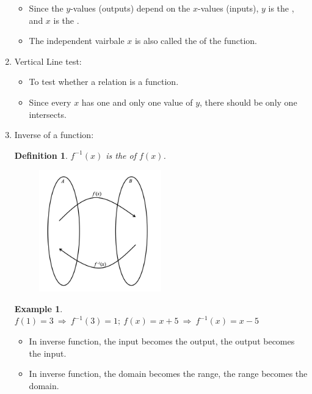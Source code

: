 \documentclass[12pt, a4paper]{article}
\newtheorem{definition}{Definition}[subsection]
\newtheorem{example}{Example}[subsection]
\begin{document}
\begin{enumerate}
\begin{itemize}
\begin{enumerate}
        \end{enumerate}
        \item Since the $y$-values (outputs) depend on the $x$-values (inputs), $y$ is the \textbf{\color{red}{dependent variable}}, and $x$ is the \textbf{\color{red}{independent variable}}.
        \item The independent vairbale $x$ is also called the \textbf{\color{red}{argument}} of the function. 
    \end{itemize}
    \item Vertical Line test: 
    \begin{itemize}
        \item To test whether a relation is a function. 
        \item Since every $x$ has one and only one value of $y$, there should be only one intersects. 
    \end{itemize}
    \item Inverse of a function: 
    \begin{definition}
        $f^{-1}(x)$ is the \textbf{\color{red}{inverse function}} of $f(x)$.
        \begin{figure}[H]
            \centering
            \includegraphics[width=0.5\textwidth]{Fig.2.1.jpg}
          \end{figure}
    \end{definition}
    \begin{example}
        $f(1)=3\ \Rightarrow\ f^{-1}(3)=1;\ f(x)=x+5\ \Rightarrow\ f^{-1}(x)=x-5$
    \end{example}
    \begin{itemize}
        \item In inverse function, the input becomes the output, the output becomes the input. 
        \item In inverse function, the domain becomes the range, the range becomes the domain. 

\end{itemize}
\end{enumerate}
\end{document}
